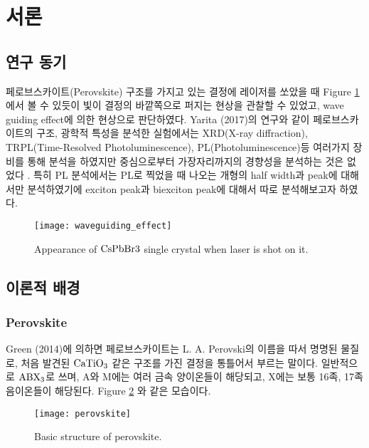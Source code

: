 
\section{서론}
\subsection{연구 동기}

페로브스카이트(Perovskite) 구조를 가지고 있는 결정에 레이저를 쏘았을 때 Figure \ref{fig:waveguide} 에서 볼 수 있듯이 빛이 결정의 바깥쪽으로 퍼지는 현상을 관찰할 수 있었고, wave guiding effect에 의한 현상으로 판단하였다. Yarita (2017)의 연구와 같이 페로브스카이트의 구조, 광학적 특성을 분석한 실험에서는 XRD(X-ray diffraction), TRPL(Time-Resolved Photoluminescence), PL(Photoluminescence)등 여러가지 장비를 통해 분석을 하였지만 중심으로부터 가장자리까지의 경향성을 분석하는 것은 없었다 \cite{yarita2017dynamics}. 특히 PL 분석에서는 PL로 찍었을 때 나오는 개형의 half width과 peak에 대해서만 분석하였기에 exciton peak과 biexciton peak에 대해서 따로 분석해보고자 하였다. 

\begin{figure}[H]
	\begin{center}
			\texttt{[image: waveguiding\_effect]}
	\end{center}
	\caption{Appearance of $\rm CsPbBr3$ single crystal when laser is shot on it.}
	\label{fig:waveguide}  
\end{figure}

\subsection{이론적 배경}

\subsubsection{Perovskite}
Green (2014)에 의하면 페로브스카이트는 L. A. Perovski의 이름을 따서 명명된 물질로, 처음 발견된 $\rm CaTiO_3$  같은 구조를 가진 결정을 통틀어서 부르는 말이다. 일반적으로 $\rm ABX_3$로 쓰며, A와 M에는 여러 금속 양이온들이 해당되고, X에는 보통 16족, 17족 음이온들이 해당된다. Figure \ref{fig:perov} 와 같은 모습이다.

\begin{figure}[H]
	\begin{center}
			\texttt{[image: perovskite]}
	\end{center}
	\caption{Basic structure of perovskite.}
	\label{fig:perov} 
\end{figure}

